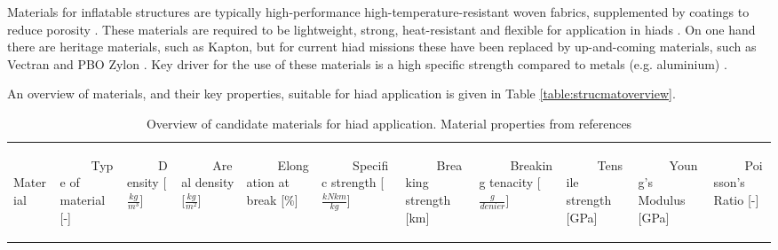 Materials for inflatable structures are typically high-performance high-temperature-resistant woven fabrics, supplemented by coatings to reduce porosity \cite{Jenkins2001}. These materials are required to be lightweight, strong, heat-resistant and flexible for application in \glspl{hiad} \cite{Samareh2011}. On one hand there are heritage materials, such as Kapton, but for current \gls{hiad} missions these have been replaced by up-and-coming materials, such as Vectran and PBO Zylon \cite{Dillman2012,  Smith2010}. Key driver for the use of these materials is a high specific strength compared to metals (e.g. aluminium) \cite{Samareh2011}. 

An overview of materials, and their key properties, suitable for \gls{hiad} application is given in Table \ref{table:strucmatoverview}. 

\begin{table}[H]
\caption{Overview of candidate materials for \gls{hiad} application. Material properties from references \cite{Samareh2011,Miller2014}}
\vspace{45mm}
\hspace{-19mm}
\begin{tabular}{p{}|p{}|p{}|p{}|p{}|p{}|p{}|p{}|p{}|p{}|p{}|}
\begin{rotate}{60} ~~~~~Material \end{rotate}  &  \begin{rotate}{60} ~~~~~Type of material {[}-{]}  \end{rotate} & \begin{rotate}{60} ~~~~~Density [$\frac{kg}{m^3}$] \end{rotate}& \begin{rotate}{60} ~~~~~Areal density [$\frac{kg}{m^2}$] \end{rotate} & \begin{rotate}{60} ~~~~~Elongation at break [$\%$] \end{rotate} & \begin{rotate}{60} ~~~~~Specific strength [$\frac{kN km}{kg}$]\end{rotate} &  \begin{rotate}{60} ~~~~~Breaking strength [km]\end{rotate} & \begin{rotate}{60} ~~~~~Breaking tenacity [$\frac{g}{denier}$]\end{rotate}&  \begin{rotate}{60} ~~~~~Tensile strength [GPa] \end{rotate} & \begin{rotate}{60} ~~~~~Young's Modulus [GPa] \end{rotate} & \begin{rotate}{60} ~~~~~Poisson's Ratio [-] \end{rotate} \\

\end{tabular}
\end{table}
